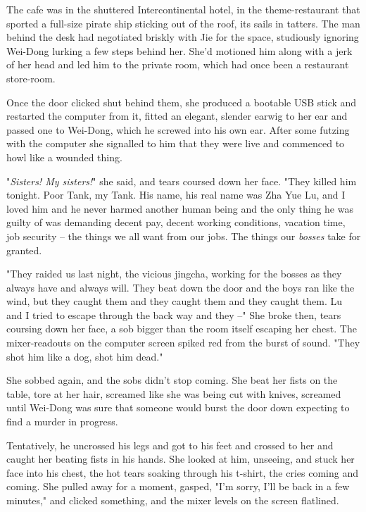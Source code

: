 The cafe was in the shuttered Intercontinental hotel, in the
theme-restaurant that sported a full-size pirate ship sticking out
of the roof, its sails in tatters. The man behind the desk had
negotiated briskly with Jie for the space, studiously ignoring
Wei-Dong lurking a few steps behind her. She'd motioned him along
with a jerk of her head and led him to the private room, which had
once been a restaurant store-room.

Once the door clicked shut behind them, she produced a bootable USB
stick and restarted the computer from it, fitted an elegant,
slender earwig to her ear and passed one to Wei-Dong, which he
screwed into his own ear. After some futzing with the computer she
signalled to him that they were live and commenced to howl like a
wounded thing.

"\emph{Sisters! My sisters!}" she said, and tears coursed down her
face. "They killed him tonight. Poor Tank, my Tank. His name, his
real name was Zha Yue Lu, and I loved him and he never harmed
another human being and the only thing he was guilty of was
demanding decent pay, decent working conditions, vacation time, job
security -- the things we all want from our jobs. The things our
\emph{bosses} take for granted.

"They raided us last night, the vicious jingcha, working for the
bosses as they always have and always will. They beat down the door
and the boys ran like the wind, but they caught them and they
caught them and they caught them. Lu and I tried to escape through
the back way and they --" She broke then, tears coursing down her
face, a sob bigger than the room itself escaping her chest. The
mixer-readouts on the computer screen spiked red from the burst of
sound. "They shot him like a dog, shot him dead."

She sobbed again, and the sobs didn't stop coming. She beat her
fists on the table, tore at her hair, screamed like she was being
cut with knives, screamed until Wei-Dong was sure that someone
would burst the door down expecting to find a murder in progress.

Tentatively, he uncrossed his legs and got to his feet and crossed
to her and caught her beating fists in his hands. She looked at
him, unseeing, and stuck her face into his chest, the hot tears
soaking through his t-shirt, the cries coming and coming. She
pulled away for a moment, gasped, "I'm sorry, I'll be back in a few
minutes," and clicked something, and the mixer levels on the screen
flatlined.

